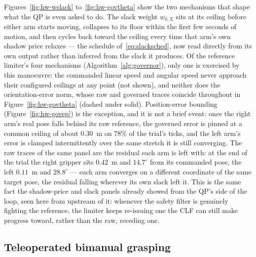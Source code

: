 \documentclass[12pt,a4paper,twoside,openright]{report}
\begin{document}
Figures~\ref{fig:hw-wslack} to~\ref{fig:hw-govtheta} show the two mechanisms that shape what the QP is even asked to do. The slack weight $w_{\delta,X}$ sits at its ceiling before either arm starts moving, collapses to its floor within the first few seconds of motion, and then cycles back toward the ceiling every time that arm's own shadow price relaxes --- the schedule of~\eqref{eq:slacksched}, now read directly from its own output rather than inferred from the slack it produces. Of the reference limiter's four mechanisms (Algorithm~\ref{alg:governor}), only one is exercised by this manoeuvre: the commanded linear speed and angular speed never approach their configured ceilings at any point (not shown), and neither does the orientation-error norm, whose raw and governed traces coincide throughout in Figure~\ref{fig:hw-govtheta} (dashed under solid). Position-error bounding (Figure~\ref{fig:hw-govep}) is the exception, and it is not a brief event: once the right arm's real pose falls behind its raw reference, the governed error is pinned at a common ceiling of about $0.30$~m on $78\%$ of the trial's ticks, and the left arm's error is clamped intermittently over the same stretch it is still converging. The raw traces of the same panel are the residual each arm is left with: at the end of the trial the right gripper sits $0.42$~m and $14.7^{\circ}$ from its commanded pose, the left $0.11$~m and $28.8^{\circ}$ --- each arm converges on a different coordinate of the same target pose, the residual falling wherever its own slack left it. This is the same fact the shadow-price and slack panels already showed from the QP's side of the loop, seen here from upstream of it: whenever the safety filter is genuinely fighting the reference, the limiter keeps re-issuing one the CLF can still make progress toward, rather than the raw, receding one.

\subsection{Teleoperated bimanual grasping}
\label{sec:hwteleop}
\end{document}
